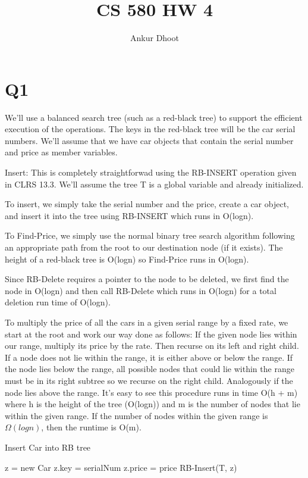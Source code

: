 \documentclass[11pt,a4paper]{article}
\begin{document}
\author{Ankur Dhoot}
\title{CS 580 HW 4}
\maketitle

\section*{Q1}
We'll use a balanced search tree (such as a red-black tree) to support the efficient execution of the operations. The keys in the red-black tree will be the car serial numbers. We'll assume that we have car objects that contain the serial number and price as member variables. 

Insert: This is completely straightforwad using the RB-INSERT operation given in CLRS 13.3. We'll assume the tree T is a global variable and already initialized.

To insert, we simply take the serial number and the price, create a car object, and insert it into the tree using RB-INSERT which runs in O(logn). 

To Find-Price, we simply use the normal binary tree search algorithm following an appropriate path from the root to our destination node (if it exists). The height of a red-black tree is O(logn) so Find-Price runs in O(logn).

Since RB-Delete requires a pointer to the node to be deleted, we first find the node in O(logn) and then call RB-Delete which runs in O(logn) for a total deletion run time of O(logn).

To multiply the price of all the cars in a given serial range by a fixed rate, we start at the root and work our way done as follows: If the given node lies within our range, multiply its price by the rate. Then recurse on its left and right child. If a node does not lie within the range, it is either above or below the range. If the node lies below the range, all possible nodes that could lie within the range must be in its right subtree so we recurse on the right child. Analogously if the node lies above the range. It's easy to see this procedure runs in time O(h + m) where h is the height of the tree (O(logn)) and m is the number of nodes that lie within the given range. If the number of nodes within the given range is $\Omega(logn)$, then the runtime is O(m).
\begin{algorithm}
	\caption{Insert Car into RB tree}
	\begin{algorithmic}[1]
	\State z = new Car
	\State z.key = serialNum
	\State z.price = price
	\State RB-Insert(T, z)
	\EndFunction
	\end{algorithmic}
	\end{algorithm}
	
\end{document}
